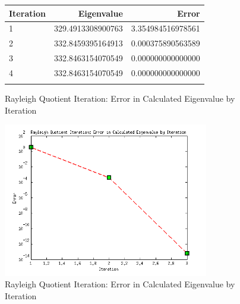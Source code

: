 \documentclass{article}
\begin{document}
\begin{figure}
\centering
\begin{tabular}{lrr}
\toprule
Iteration & Eigenvalue & Error \\
\midrule
 1 & 329.4913308900763 & 3.354984516978561 \\
 2 & 332.8459395164913 & 0.000375890563589 \\
 3 & 332.8463154070549 & 0.000000000000000 \\
 4 & 332.8463154070549 & 0.000000000000000 \\
\bottomrule
\label{p2t1}
\end{tabular}
\caption{Rayleigh Quotient Iteration: Error in Calculated Eigenvalue by Iteration}
\end{figure}

\begin{figure}
\centering
\includegraphics[width=0.8\textwidth]{Problem2Figure1.png}
\caption{Rayleigh Quotient Iteration: Error in Calculated Eigenvalue by Iteration}
\label{p2f1}
\end{figure}
\end{document}
